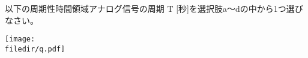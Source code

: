 以下の周期性時間領域アナログ信号の周期 $\textrm{T}$ [秒]を選択肢a〜dの中から1つ選びなさい。

\centering\texttt{[image: \\filedir/q.pdf]}
